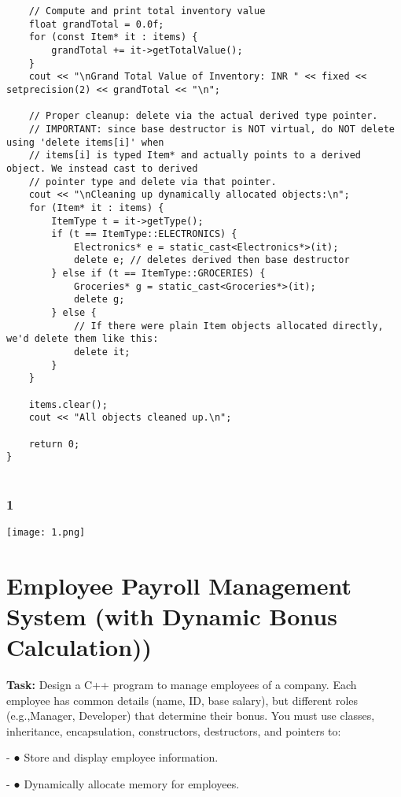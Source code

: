 \documentclass[12pt,a4paper]{article}
\begin{document}
\begin{lstlisting}
    // Compute and print total inventory value
    float grandTotal = 0.0f;
    for (const Item* it : items) {
        grandTotal += it->getTotalValue();
    }
    cout << "\nGrand Total Value of Inventory: INR " << fixed << setprecision(2) << grandTotal << "\n";

    // Proper cleanup: delete via the actual derived type pointer.
    // IMPORTANT: since base destructor is NOT virtual, do NOT delete using 'delete items[i]' when
    // items[i] is typed Item* and actually points to a derived object. We instead cast to derived
    // pointer type and delete via that pointer.
    cout << "\nCleaning up dynamically allocated objects:\n";
    for (Item* it : items) {
        ItemType t = it->getType();
        if (t == ItemType::ELECTRONICS) {
            Electronics* e = static_cast<Electronics*>(it);
            delete e; // deletes derived then base destructor
        } else if (t == ItemType::GROCERIES) {
            Groceries* g = static_cast<Groceries*>(it);
            delete g;
        } else {
            // If there were plain Item objects allocated directly, we'd delete them like this:
            delete it;
        }
    }

    items.clear();
    cout << "All objects cleaned up.\n";

    return 0;
}


\end{lstlisting}

\subsubsection{1}
\begin{center}
    \texttt{[image: 1.png]}
\end{center}



\section{Employee Payroll Management System (with Dynamic Bonus Calculation))}
\textbf{Task:} Design a C++ program to manage employees of a company.
Each employee has common details (name, ID, base salary), but different roles (e.g.,Manager, Developer) that determine their bonus.
You must use classes, inheritance, encapsulation, constructors, destructors, and pointers to:
    \item - ● Store and display employee information.
    \item - ● Dynamically allocate memory for employees.
\end{document}
